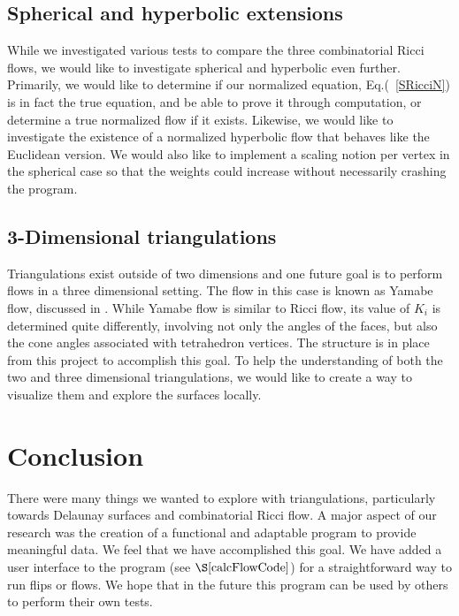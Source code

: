 \documentclass[12pt]{article}
\begin{document}
\subsection{Spherical and hyperbolic extensions}
While we investigated various tests to compare the three combinatorial Ricci flows, we would like to investigate spherical and hyperbolic even further. Primarily, we would like to determine if our normalized equation, Eq.(~\ref{SRicciN}) is in fact the true equation, and be able to prove it through computation, or determine a true normalized flow if it exists. Likewise, we would like to investigate the existence of a normalized hyperbolic flow that behaves like the Euclidean version. We would also like to implement a scaling notion per vertex in the spherical case so that the weights could increase without necessarily crashing the program. 

\subsection{3-Dimensional triangulations}
Triangulations exist outside of two dimensions and one future goal is to perform flows in a three dimensional setting. The flow in this case is known as Yamabe flow, discussed in \cite{DrG}. While Yamabe flow is similar to Ricci flow, its value of $K_i$ is determined quite differently, involving not only the angles of the faces, but also the cone angles associated with tetrahedron vertices. The structure is in place from this project to accomplish this goal. To help the understanding of both the two and three dimensional triangulations, we would like to create a way to visualize them and explore the surfaces locally.\newline

\section{Conclusion}

There were many things we wanted to explore with triangulations, particularly towards Delaunay surfaces and combinatorial Ricci flow. A major aspect of our research was the creation of a functional and adaptable program to provide meaningful data. We feel that we have accomplished this goal. We have added a user interface to the program (see $\S\ref{calcFlowCode}$) for a straightforward way to run flips or flows. We hope that in the future this program can be used by others to perform their own tests.\newline
\end{document}
